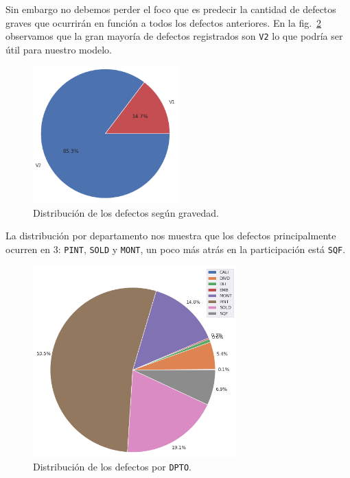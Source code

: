 \documentclass[a4paper,12pt]{article}
\begin{document}
Sin embargo no debemos perder el foco que es predecir la cantidad de defectos graves que ocurrirán en función a todos los defectos anteriores. En la fig.~\ref{fig:distgvddpto} observamos que la gran mayoría de defectos registrados son \texttt{V2} lo que podría ser útil para nuestro modelo.

\begin{figure}[H]
	\begin{center}				
	\includegraphics[width=0.5\textwidth]{tesis_51.png}
  	\caption{Distribución de los defectos según gravedad.}
  	\label{fig:distgvd}
  	\end{center}
\end{figure}

La distribución por departamento nos muestra que los defectos principalmente ocurren en 3: \texttt{PINT}, \texttt{SOLD} y \texttt{MONT}, un poco más atrás en la participación está \texttt{SQF}.

\begin{figure}[H]
	\begin{center}				
	\includegraphics[width=0.7\textwidth]{tesis_53.png}
  	\caption{Distribución de los defectos por \texttt{DPTO}.}
  	\label{fig:distgvddpto}
  	\end{center}
\end{figure}
\end{document}
